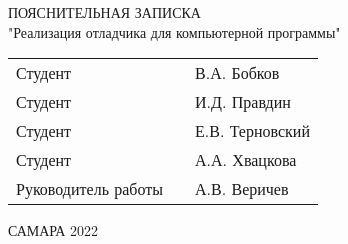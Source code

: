 \documentclass[oneside,final,14pt]{extreport}
\begin{document}
\begin{titlepage}
		\begin{center}{ПОЯСНИТЕЛЬНАЯ ЗАПИСКА\\
			"Реализация отладчика для компьютерной программы"\\
		}\end{center}
		\vfill
		\begin{table}[h]
			\noindent
			\begin{tabularx}{\textwidth}{p{}p{}X}
				Студент  &  \rightline{$\underset{\text{\itshape ({\small подпись})}}{\underline{\hspace{0.2\textwidth}}}$} &   В.А. Бобков\\
				Студент &  \rightline{$\underset{\text{\itshape ({\small подпись})}}{\underline{\hspace{0.2\textwidth}}}$} &  И.Д. Правдин \\
				Студент &  \rightline{$\underset{\text{\itshape ({\small подпись})}}{\underline{\hspace{0.2\textwidth}}}$} & Е.В. Терновский\\
				Студент &  \rightline{$\underset{\text{\itshape ({\small подпись})}}{\underline{\hspace{0.2\textwidth}}}$} &   А.А. Хвацкова \\
				Руководитель работы&  \rightline{$\underset{\text{\itshape ({\small подпись})}}{\underline{\hspace{0.2\textwidth}}}$} & А.В. Веричев \\
			\end{tabularx}
		\end{table}
		\mbox{}
		\vfill
		\centerline{САМАРА 2022}
\end{titlepage}
\setcounter{page}{2} 
\end{document}
